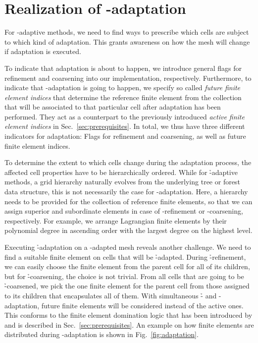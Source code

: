\section{Realization of \hp-adaptation}
\label{sec:adaptation}

For \hp{}-adaptive methods, we need to find ways to prescribe which cells are subject to which kind of adaptation. This grants awareness on how the mesh will change if adaptation is executed.

To indicate that adaptation is about to happen, we introduce general flags for refinement and coarsening into our implementation, respectively. Furthermore, to indicate that \p-adaptation is going to happen, we specify so called \textit{future finite element indices} that determine the reference finite element from the collection that will be associated to that particular cell after adaptation has been performed. They act as a counterpart to the previously introduced \textit{active finite element indices} in Sec.~\ref{sec:prerequisites}. In total, we thus have three different indicators for adaptation: Flags for refinement and coarsening, as well as future finite element indices.

To determine the extent to which cells change during the adaptation process, the affected cell properties have to be hierarchically ordered. While for \h-adaptive methods, a grid hierarchy naturally evolves from the underlying tree or forest data structure, this is not necessarily the case for \p-adaptation. Here, a hierarchy needs to be provided for the collection of reference finite elements, so that we can assign superior and subordinate elements in case of \p-refinement or \p-coarsening, respectively. For example, we arrange Lagrangian finite elements by their polynomial degree in ascending order with the largest degree on the highest level.

Executing \h-adaptation on a \p-adapted mesh reveals another challenge. We need to find a suitable finite element on cells that will be \h-adapted. During \h-refinement, we can easily choose the finite element from the parent cell for all of its children, but for \h-coarsening, the choice is not trivial. From all cells that are going to be \h-coarsened, we pick the one finite element for the parent cell from those assigned to its children that encapsulates all of them. With simultaneous \h- and \p-adaptation, future finite elements will be considered instead of the active ones. This conforms to the finite element domination logic that has been introduced by \textcite{bangerth2009} and is described in Sec.~\ref{sec:prerequisites}. An example on how finite elements are distributed during \hp-adaptation is shown in Fig.~\ref{fig:adaptation}.

